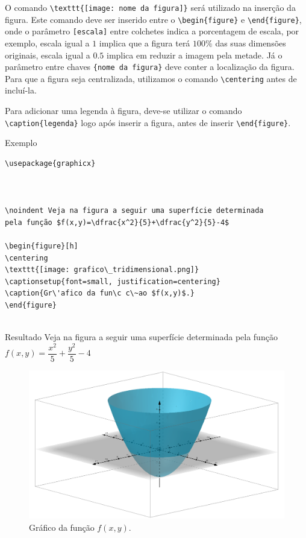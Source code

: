 \noindent O comando \verb|\texttt{[image: nome da figura]}| ser\'a utilizado na inser\c c\~ao da figura. Este comando deve ser inserido entre o \verb|\begin{figure}| e \verb|\end{figure}|, onde o par\^ametro \verb|[escala]| entre colchetes indica a porcentagem de escala, por exemplo, escala igual a $1$ implica que a figura terá $100\%$ das suas dimensões originais, escala igual a $0.5$ implica em reduzir a imagem pela metade. Já o parâmetro entre chaves \verb|{nome da figura}| deve conter a localização da figura. Para que a figura seja centralizada, utilizamos o comando \verb|\centering| antes de inclu\'i-la.

\noindent Para adicionar uma legenda \`a figura, deve-se utilizar o comando \verb|\caption{legenda}| logo ap\'os inserir a figura, antes de inserir \verb|\end{figure}|. \\

\begin{trailer}{Exemplo}
\begin{verbatim}
\usepackage{graphicx}



\noindent Veja na figura a seguir uma superfície determinada 
pela função $f(x,y)=\dfrac{x^2}{5}+\dfrac{y^2}{5}-4$

\begin{figure}[h]
\centering
\texttt{[image: grafico\_tridimensional.png]}
\captionsetup{font=small, justification=centering}
\caption{Gr\'afico da fun\c c\~ao $f(x,y)$.}
\end{figure}  


\end{verbatim}
\end{trailer}

\begin{trailer}{Resultado}
 \noindent Veja na figura a seguir uma superfície determinada pela função $f(x,y)=\dfrac{x^2}{5}+\dfrac{y^2}{5}-4$

\begin{figure}[H]
\centering
\includegraphics[scale=0.15]{author/grafico_tridim.png}
\captionsetup{font=small, justification=centering}
\caption{Gr\'afico da fun\c c\~ao $f(x,y)$.}
\end{figure}   
\end{trailer}

